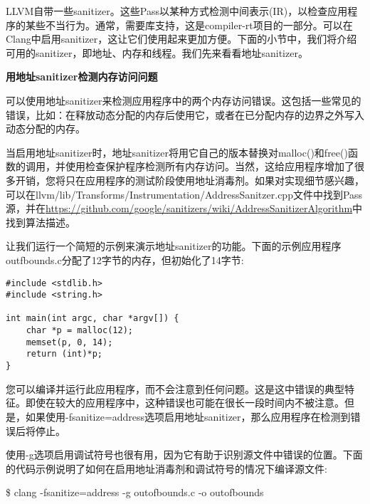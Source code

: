 
LLVM自带一些sanitizer。这些Pass以某种方式检测中间表示(IR)，以检查应用程序的某些不当行为。通常，需要库支持，这是compiler-rt项目的一部分。可以在Clang中启用sanitizer，这让它们使用起来更加方便。下面的小节中，我们将介绍可用的sanitizer，即地址、内存和线程。我们先来看看地址sanitizer。\par

\hspace*{\fill} \par %
\textbf{用地址sanitizer检测内存访问问题}

可以使用地址sanitizer来检测应用程序中的两个内存访问错误。这包括一些常见的错误，比如：在释放动态分配的内存后使用它，或者在已分配内存的边界之外写入动态分配的内存。\par

当启用地址sanitizer时，地址sanitizer将用它自己的版本替换对malloc()和free()函数的调用，并使用检查保护程序检测所有内存访问。当然，这给应用程序增加了很多开销，您将只在应用程序的测试阶段使用地址消毒剂。如果对实现细节感兴趣，可以在llvm/lib/Transforms/Instrumentation/\allowbreak AddressSanitzer.cpp文件中找到Pass源，并在\url{https://github.com/google/sanitizers/wiki/AddressSanitizerAlgorithm}中找到算法描述。\par

让我们运行一个简短的示例来演示地址sanitizer的功能。下面的示例应用程序outfbounds.c分配了12字节的内存，但初始化了14字节:\par

\begin{lstlisting}[caption={}]
#include <stdlib.h>
#include <string.h>

int main(int argc, char *argv[]) {
	char *p = malloc(12);
	memset(p, 0, 14);
	return (int)*p;
}
\end{lstlisting}

您可以编译并运行此应用程序，而不会注意到任何问题。这是这中错误的典型特征。即使在较大的应用程序中，这种错误也可能在很长一段时间内不被注意。但是，如果使用-fsanitize=address选项启用地址sanitizer，那么应用程序在检测到错误后将停止。\par

使用-g选项启用调试符号也很有用，因为它有助于识别源文件中错误的位置。下面的代码示例说明了如何在启用地址消毒剂和调试符号的情况下编译源文件:\par

\begin{tcolorbox}[colback=white,colframe=black]
\$ clang -fsanitize=address -g outofbounds.c -o outofbounds
\end{tcolorbox}


